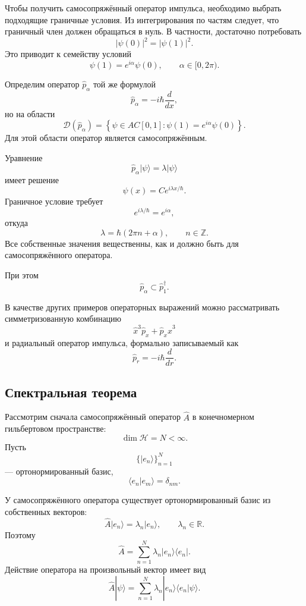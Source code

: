 \documentclass[12pt,a4paper]{article}
\begin{document}
Чтобы получить самосопряжённый оператор импульса, необходимо выбрать
подходящие граничные условия. Из интегрирования по частям следует, что
граничный член должен обращаться в нуль. В частности, достаточно
потребовать
\[
    |\psi(0)|^2=|\psi(1)|^2.
\]
Это приводит к семейству условий
\[
    \boxed{
        \psi(1)=e^{i\alpha}\psi(0),
        \qquad
        \alpha\in[0,2\pi)
    }.
\]

Определим оператор $\hat p_\alpha$ той же формулой
\[
    \hat p_\alpha
    =
    -i\hbar\frac{d}{dx},
\]
но на области
\[
    \boxed{
    \mathcal D(\hat p_\alpha)
    =
    \left\{
        \psi\in AC[0,1]:
        \psi(1)=e^{i\alpha}\psi(0)
    \right\}
    }.
\]
Для этой области оператор является самосопряжённым.

Уравнение
\[
    \hat p_\alpha|\psi\rangle
    =
    \lambda|\psi\rangle
\]
имеет решение
\[
    \psi(x)=Ce^{i\lambda x/\hbar}.
\]
Граничное условие требует
\[
    e^{i\lambda/\hbar}=e^{i\alpha},
\]
откуда
\[
    \boxed{
        \lambda
        =
        \hbar(2\pi n+\alpha),
        \qquad
        n\in\mathbb Z
    }.
\]
Все собственные значения вещественны, как и должно быть для
самосопряжённого оператора.

При этом
\[
    \hat p_\alpha
    \subset
    \hat p_1^\dagger.
\]

В качестве других примеров операторных выражений можно рассматривать
симметризованную комбинацию
\[
    \boxed{
        \hat x^3\hat p_x
        +
        \hat p_x\hat x^3
    }
\]
и радиальный оператор импульса, формально записываемый как
\[
    \boxed{
        \hat p_r
        =
        -i\hbar\frac{d}{dr}
    }.
\]


\subsection{Спектральная теорема}

Рассмотрим сначала самосопряжённый оператор $\hat A$ в
конечномерном гильбертовом пространстве:
\[
    \dim\mathcal H=N<\infty.
\]
Пусть
\[
    \{|e_n\rangle\}_{n=1}^{N}
\]
--- ортонормированный базис,
\[
    \langle e_n|e_m\rangle
    =
    \delta_{nm}.
\]

У самосопряжённого оператора существует ортонормированный базис из
собственных векторов:
\[
    \boxed{
        \hat A|e_n\rangle
        =
        \lambda_n|e_n\rangle,
        \qquad
        \lambda_n\in\mathbb R
    }.
\]
Поэтому
\[
    \boxed{
        \hat A
        =
        \sum_{n=1}^{N}
        \lambda_n
        |e_n\rangle\langle e_n|
    }.
\]
Действие оператора на произвольный вектор имеет вид
\[
    \hat A|\psi\rangle
    =
    \sum_{n=1}^{N}
        \lambda_n
        |e_n\rangle
        \langle e_n|\psi\rangle.
\]
\end{document}
